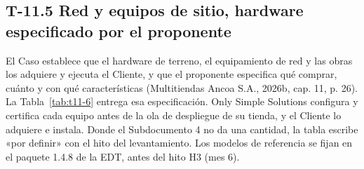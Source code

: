 \documentclass[11pt]{article}
\begin{document}
\subsection{T-11.5 Red y equipos de sitio, hardware especificado por el proponente}\label{t-11-5}

El Caso establece que el hardware de terreno, el equipamiento de red y las obras los adquiere y ejecuta el Cliente, y que el proponente especifica qué comprar, cuánto y con qué características (Multitiendas Ancoa S.A., 2026b, cap. 11, p. 26). La Tabla~\mbox{\ref{tab:t11-6}} entrega esa especificación. Only Simple Solutions configura y certifica cada equipo antes de la ola de despliegue de su tienda, y el Cliente lo adquiere e instala. Donde el Subdocumento 4 no da una cantidad, la tabla escribe «por definir» con el hito del levantamiento. Los modelos de referencia se fijan en el paquete 1.4.8 de la EDT, antes del hito H3 (mes 6).
\end{document}
